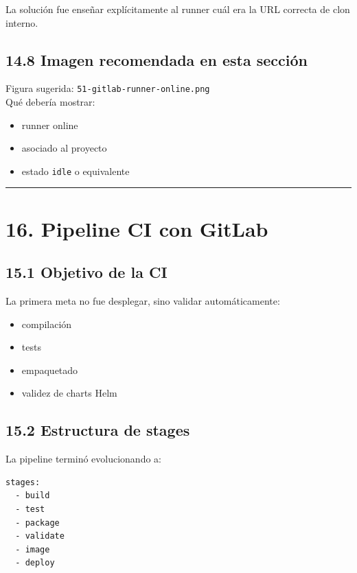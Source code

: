 \documentclass[
a4paper,
12pt]{report}
\providecommand{\tightlist}{%
  \setlength{\itemsep}{0pt}\setlength{\parskip}{0pt}}
\begin{document}
La solución fue enseñar explícitamente al runner cuál era la URL
correcta de clon interno.

\section{14.8 Imagen recomendada en esta
sección}\label{imagen-recomendada-en-esta-secciuxf3n-8}

Figura sugerida: \texttt{51-gitlab-runner-online.png}\\
Qué debería mostrar:

\begin{itemize}
\tightlist
\item
  runner online
\item
  asociado al proyecto
\item
  estado \texttt{idle} o equivalente
\end{itemize}

\begin{center}\rule{0.5\linewidth}{0.5pt}\end{center}

\chapter{16. Pipeline CI con GitLab}\label{pipeline-ci-con-gitlab}

\section{15.1 Objetivo de la CI}\label{objetivo-de-la-ci}

La primera meta no fue desplegar, sino validar automáticamente:

\begin{itemize}
\tightlist
\item
  compilación
\item
  tests
\item
  empaquetado
\item
  validez de charts Helm
\end{itemize}

\section{15.2 Estructura de stages}\label{estructura-de-stages}

La pipeline terminó evolucionando a:

\begin{verbatim}
stages:
  - build
  - test
  - package
  - validate
  - image
  - deploy
\end{verbatim}
\end{document}
